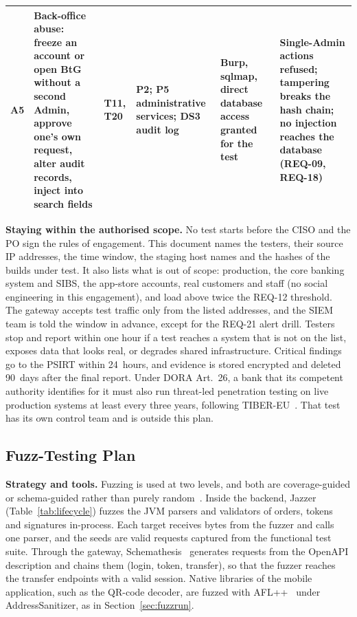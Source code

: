 \begin{table}[!t]
\begin{tabularx}{\textwidth}{@{}L{0.45cm}L{2.6cm}L{1.2cm}L{3.1cm}L{2.7cm}Y@{}}
A5 & Back-office abuse: freeze an account or open \ac{BtG} without a second Admin, approve one's own request, alter audit records, inject into search fields & T11, T20 & P2; P5 administrative services; DS3 audit log & Burp, sqlmap, direct database access granted for the test & Single-Admin actions refused; tampering breaks the hash chain; no injection reaches the database (REQ-09, REQ-18) \\
\bottomrule
\end{tabularx}
\end{table}

\textbf{Staying within the authorised scope.} No test starts before the
CISO and the PO sign the rules of engagement. This document names the
testers, their source IP addresses, the time window, the staging host
names and the hashes of the builds under test. It also lists what is out
of scope: production, the core banking system and SIBS, the app-store
accounts, real customers and staff (no social engineering in this
engagement), and load above twice the \mbox{REQ-12} threshold. The
gateway accepts test traffic only from the listed addresses, and the
\ac{SIEM} team is told the window in advance, except for the
\mbox{REQ-21} alert drill. Testers stop and report within one hour if a
test reaches a system that is not on the list, exposes data that looks
real, or degrades shared infrastructure. Critical findings go to the
\ac{PSIRT} within 24~hours, and evidence is stored encrypted and deleted
90~days after the final report. Under \ac{DORA} Art.~26, a bank that
its competent authority identifies for it must also run threat-led
penetration testing on live production systems at least every three
years, following TIBER-EU~\cite{tibereu}. That test has its own control
team and is outside this plan.

\subsection{Fuzz-Testing Plan}

\textbf{Strategy and tools.} Fuzzing is used at two levels, and both are
coverage-guided or schema-guided rather than purely random~\cite{miller1990}.
Inside the backend, Jazzer~\cite{jazzer} (Table~\ref{tab:lifecycle})
fuzzes the JVM parsers and validators of orders, tokens and signatures
in-process. Each target receives bytes from the fuzzer and calls one
parser, and the seeds are valid requests captured from the functional
test suite. Through the gateway, Schemathesis~\cite{schemathesis}
generates requests from the OpenAPI description and chains them
(login, token, transfer), so that the fuzzer reaches the transfer
endpoints with a valid session. Native libraries of the mobile
application, such as the QR-code decoder, are fuzzed with
AFL++~\cite{aflpp2020} under AddressSanitizer, as in
Section~\ref{sec:fuzzrun}.

